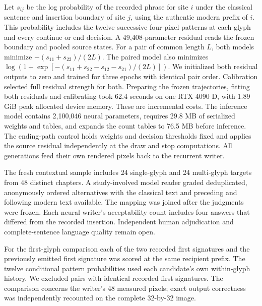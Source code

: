 \documentclass[12pt,a4paper]{article}
\providecommand{\DIFadd}[1]{{\protect\color{blue} \sf #1}} %
\begin{document}
\DIFadd{Let $s_{ij}$ be the log probability of the recorded phrase for site $i$ under the classical sentence and insertion boundary of site $j$, using the authentic modern prefix of $i$. This probability includes the twelve successive four-pixel patterns at each glyph and every continue or end decision. A 49,408-parameter residual reads the frozen boundary and pooled source states. For a pair of common length $L$, both models minimize $-(s_{11}+s_{22})/(2L)$. The paired model also minimizes $\log(1+\exp[-(s_{11}+s_{22}-s_{12}-s_{21})/(2L)])$. We initialized both residual outputs to zero and trained for three epochs with identical pair order. Calibration selected full residual strength for both. Preparing the frozen trajectories, fitting both residuals and calibrating took 62.4 seconds on one RTX 4090 D, with 1.89 GiB peak allocated device memory. These are incremental costs. The inference model contains 2,100,046 neural parameters, requires 29.8 MB of serialized weights and tables, and expands the count tables to 76.5 MB before inference. The ending-path control holds weights and decision thresholds fixed and applies the source residual independently at the draw and stop computations. All generations feed their own rendered pixels back to the recurrent writer.
}

\DIFadd{The fresh contextual sample includes 24 single-glyph and 24 multi-glyph targets from 48 distinct chapters. A study-involved model reader graded deduplicated, anonymously ordered alternatives with the classical text and preceding and following modern text available. The mapping was joined after the judgments were frozen. Each neural writer's acceptability count includes four answers that differed from the recorded insertion. Independent human adjudication and complete-sentence language quality remain open.
}

\DIFadd{For the first-glyph comparison each of the two recorded first signatures and the previously emitted first signature was scored at the same recipient prefix. The twelve conditional pattern probabilities used each candidate's own within-glyph history. We excluded pairs with identical recorded first signatures. The comparison concerns the writer's 48 measured pixels; exact output correctness was independently recounted on the complete 32-by-32 image.
}
\end{document}
